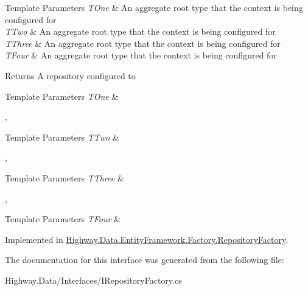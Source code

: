 \begin{DoxyTemplParams}{Template Parameters}
{\em T\-One} & An aggregate root type that the context is being configured for\\
\hline
{\em T\-Two} & An aggregate root type that the context is being configured for\\
\hline
{\em T\-Three} & An aggregate root type that the context is being configured for\\
\hline
{\em T\-Four} & An aggregate root type that the context is being configured for\\
\hline
\end{DoxyTemplParams}
\begin{DoxyReturn}{Returns}
A repository configured to 
\begin{DoxyTemplParams}{Template Parameters}
{\em T\-One} & \\
\hline
\end{DoxyTemplParams}
,
\begin{DoxyTemplParams}{Template Parameters}
{\em T\-Two} & \\
\hline
\end{DoxyTemplParams}
,
\begin{DoxyTemplParams}{Template Parameters}
{\em T\-Three} & \\
\hline
\end{DoxyTemplParams}
,
\begin{DoxyTemplParams}{Template Parameters}
{\em T\-Four} & \\
\hline
\end{DoxyTemplParams}

\end{DoxyReturn}


Implemented in \hyperlink{class_highway_1_1_data_1_1_entity_framework_1_1_factory_1_1_repository_factory_a7299e0d5fdaf1ceceaf7fbac1d010816}{Highway.\-Data.\-Entity\-Framework.\-Factory.\-Repository\-Factory}.



The documentation for this interface was generated from the following file\-:\begin{DoxyCompactItemize}
\item 
Highway.\-Data/\-Interfaces/I\-Repository\-Factory.\-cs\end{DoxyCompactItemize}
